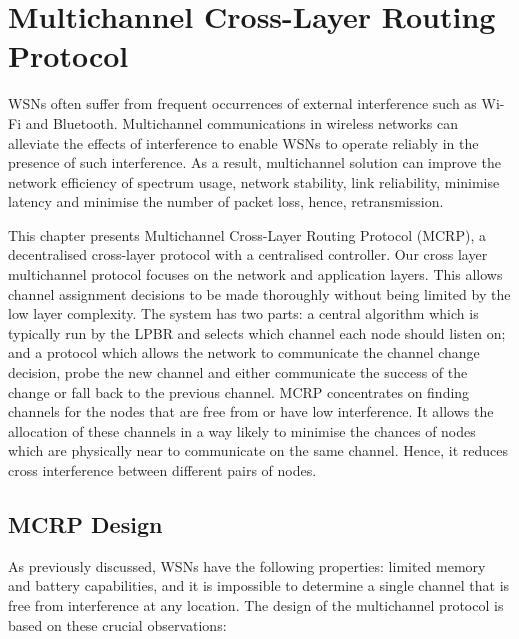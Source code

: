 \chapter{Multichannel Cross-Layer Routing Protocol}
\label{MCRP}

WSNs often suffer from frequent occurrences of external interference such as Wi-Fi and Bluetooth.
Multichannel communications in wireless networks can alleviate the effects of interference to enable WSNs to operate reliably in the presence of such interference. As a result, multichannel solution can improve the network efficiency of spectrum usage, network stability, link reliability, minimise latency and minimise the number of packet loss, hence, retransmission.

This chapter presents Multichannel Cross-Layer Routing Protocol (MCRP), a decentralised cross-layer protocol with a centralised controller. Our cross layer multichannel protocol focuses on the network and application layers. This allows channel assignment decisions to be made thoroughly without being limited by the low layer complexity. The system has two parts: a central algorithm which is typically run by the LPBR and selects which channel each node should listen on; and a protocol which allows the network to communicate the channel change decision, probe the new channel and either communicate the success of the change or fall back to the previous channel. MCRP concentrates on finding channels for the nodes that are free from or have low interference. It allows the allocation of these channels in a way likely to minimise the chances of nodes which are physically near to communicate on the same channel. Hence, it reduces cross interference between different pairs of nodes.

\section{MCRP Design}
As previously discussed, WSNs have the following properties: limited memory and battery capabilities, and it is impossible to determine a single channel that is free from interference at any location. 
The design of the multichannel protocol is based on these crucial observations: 

